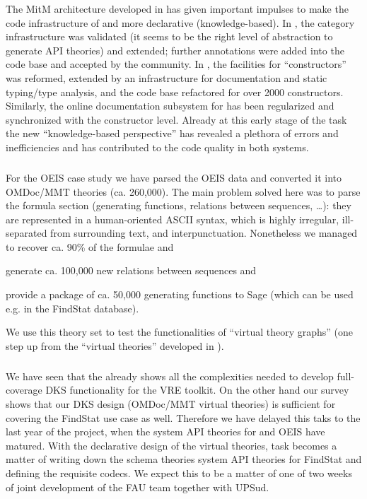 The MitM architecture developed in  has given important impulses to make the code infrastructure of \Sage and \GAP more declarative (knowledge-based).
In \Sage, the category infrastructure was validated (it seems to be the right level of abstraction to generate API theories) and extended; further annotations were added into the \Sage code base and accepted by the community. %
In \GAP, the facilities for ``constructors'' was reformed, extended by an infrastructure for documentation and static typing/type analysis, and the code base refactored for over 2000 constructors.
Similarly, the online documentation subsystem for \GAP has been regularized and synchronized with the constructor level.
Already at this early stage of the task the new ``knowledge-based perspective'' has revealed a plethora of errors and inefficiencies and has contributed to the code quality in both systems.
\medskip

\subparagraph{}

For the OEIS case study we have parsed the OEIS data and converted it into OMDoc/MMT theories (ca. 260,000).
The main problem solved here was to parse the formula section (generating functions, relations between sequences, \ldots): they are represented in a human-oriented ASCII syntax, which is highly irregular, ill-separated from surrounding text, and interpunctuation.
Nonetheless we managed to recover ca. 90\% of the formulae and
\begin{compactenum}[\em i\rm)]
\item generate ca. 100,000 new relations between sequences and
\item provide a package of ca. 50,000 generating functions to Sage (which can be used
  e.g. in the FindStat database).
\end{compactenum}
We use this theory set to test the functionalities of ``virtual theory graphs'' (one step up from the ``virtual theories'' developed in ).
\medskip

\subparagraph{}
We have seen that the \LMFDB already shows all the complexities needed to develop full-coverage DKS functionality for the \pn VRE toolkit.
On the other hand our survey shows that our DKS design (OMDoc/MMT virtual theories) is sufficient for covering the FindStat use case as well.
Therefore we have delayed this taks to the last year of the \pn project, when the system API theories for \Sage and OEIS have matured. With the declarative design of the virtual theories, task  becomes a matter of writing down the schema theories system API theories for FindStat and defining the requisite codecs. We expect this to be a matter of one of two weeks of joint development of the FAU team together with UPSud. 
\medskip

